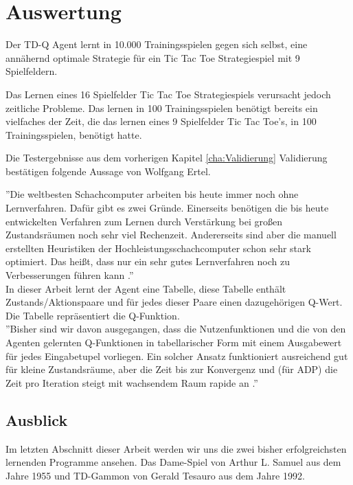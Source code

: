 \chapter{Auswertung}
\label{cha:Auswertung}
Der TD-Q Agent lernt in 10.000 Trainingsspielen gegen sich selbst, eine annähernd optimale Strategie für ein Tic Tac Toe Strategiespiel mit 9 Spielfeldern.

Das Lernen eines 16 Spielfelder Tic Tac Toe Strategiespiels verursacht jedoch zeitliche Probleme. Das lernen in 100 Trainingsspielen benötigt bereits ein vielfaches der Zeit, die das lernen eines 9 Spielfelder Tic Tac Toe's, in 100 Trainingsspielen, benötigt hatte.

Die Testergebnisse aus dem vorherigen Kapitel \ref{cha:Validierung} Validierung bestätigen folgende Aussage von Wolfgang Ertel.

''Die weltbesten Schachcomputer arbeiten bis heute immer noch ohne Lernverfahren. Dafür gibt es zwei Gründe. Einerseits benötigen die bis heute entwickelten Verfahren zum Lernen durch Verstärkung bei großen Zustandsräumen noch sehr viel Rechenzeit. Andererseits sind aber die manuell erstellten Heuristiken der Hochleistungsschachcomputer schon sehr stark optimiert. Das heißt, dass nur ein sehr gutes Lernverfahren noch zu Verbesserungen führen kann \cite[120]{Ertel}.''\\

In dieser Arbeit lernt der Agent eine Tabelle, diese Tabelle enthält Zustands/Aktionspaare und für jedes dieser Paare einen dazugehörigen Q-Wert. Die Tabelle repräsentiert die Q-Funktion. \\

''Bisher sind wir davon ausgegangen, dass die Nutzenfunktionen und die von den Agenten gelernten Q-Funktionen in tabellarischer Form mit einem Ausgabewert für jedes Eingabetupel vorliegen. Ein solcher Ansatz funktioniert ausreichend gut für kleine Zustandsräume, aber die Zeit bis zur Konvergenz und (für ADP) die Zeit pro Iteration steigt mit wachsendem Raum rapide an \cite[975]{Russell}.''   



\section{Ausblick}
Im letzten Abschnitt dieser Arbeit werden wir uns die zwei bisher erfolgreichsten lernenden Programme ansehen. Das Dame-Spiel von Arthur L. Samuel aus dem Jahre 1955 und TD-Gammon von Gerald Tesauro aus dem Jahre 1992. 

